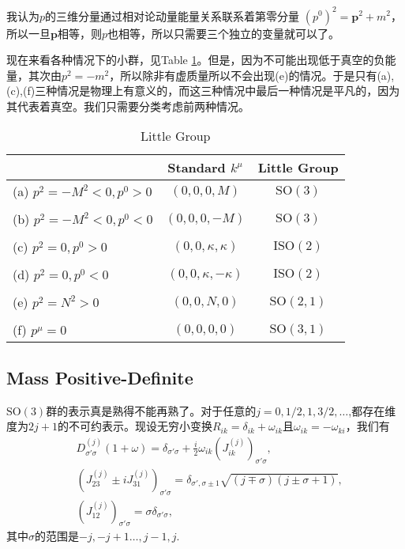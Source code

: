 我认为$p$的三维分量通过相对论动量能量关系联系着第零分量
$(p^0)^2=\bm{p}^2+m^2$，所以一旦$\bm{p}$相等，则$p$也相等，所以只需要三个独立的变量就可以了。

现在来看各种情况下的小群，见Table \ref{little group}。但是，因为不可能出现低于真空的负能量，其次由$p^2=-m^2$，所以除非有虚质量所以不会出现(e)的情况。于是只有(a),(c),(f)三种情况是物理上有意义的，而这三种情况中最后一种情况是平凡的，因为其代表着真空。我们只需要分类考虑前两种情况。

\begin{table}[ht]
\centering
\begin{tabular}{l c c}
&Standard $k^\mu$ & Little Group\\
\hline
(a) $p^2=-M^2<0,p^0>0$ & $(0,0,0,M)$ & $\mathrm{SO}\left(3\right)$\\
\\
(b) $p^2=-M^2<0,p^0<0$ & $(0,0,0,-M)$ & $\mathrm{SO}\left(3\right)$\\
\\
(c) $p^2=0,p^0>0$ & $(0,0,\kappa,\kappa)$ & $\mathrm{ISO}\left(2\right)$\\
\\
(d) $p^2=0,p^0<0$ & $(0,0,\kappa,-\kappa)$ & $\mathrm{ISO}\left(2\right)$\\
\\
(e) $p^2=N^2>0$ & $(0,0,N,0)$ & $\mathrm{SO}\left(2,1\right)$\\
\\
(f) $p^\mu=0$ & $(0,0,0,0)$ & $\mathrm{SO}\left(3,1\right)$\\
\hline
\end{tabular}
\caption{Little Group}
\label{little group}
\end{table}

\subsection*{Mass Positive-Definite}
$\mathrm{SO}(3)$群的表示真是熟得不能再熟了。对于任意的$j=0,1/2,1,3/2,\dots$,都存在维度为$2j+1$的不可约表示。现设无穷小变换$R_{ik}=\delta_{ik}+\omega_{ik}$且$\omega_{ik}=-\omega_{ki}$，我们有
\[
\begin{split}
&D^{(j)}_{\sigma'\sigma}(1+\omega)=\delta_{\sigma'\sigma}+\frac{i}{2}\omega_{ik}(J^{(j)}_{ik})_{\sigma'\sigma},\\
&(J^{(j)}_{23}\pm iJ^{(j)}_{31})_{\sigma'\sigma}=\delta_{\sigma',\sigma\pm 1}\sqrt{(j\mp\sigma)(j\pm\sigma+1)},\\
&(J^{(j)}_{12})_{\sigma'\sigma}=\sigma\delta_{\sigma'\sigma},
\end{split}
\]
其中$\sigma$的范围是$-j,-j+1\dots,j-1,j$.

